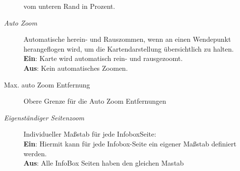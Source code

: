 \begin{description}
vom unteren Rand in Prozent.
\item[\textit{Auto Zoom}]  Automatische herein- und Rauszommen, wenn an einen Wendepunkt herangeflogen wird, um die Kartendarstellung übersichtlich zu halten.\\
{\bf Ein}:  Karte wird automatisch rein- und rausgezoomt.\\
{\bf Aus}: Kein automatisches Zoomen.
\item[Max. auto Zoom Entfernung]  Obere Grenze für die Auto Zoom Entfernungen
\item[\textit{Eigenständiger Seitenzoom}] Individueller Maßstab für jede InfoboxSeite:\\
{\bf Ein}: Hiermit kann für jede Infobox-Seite ein eigener Maßstab definiert werden. \\
{\bf Aus}: Alle InfoBox Seiten haben den gleichen Mastab

\end{description}


